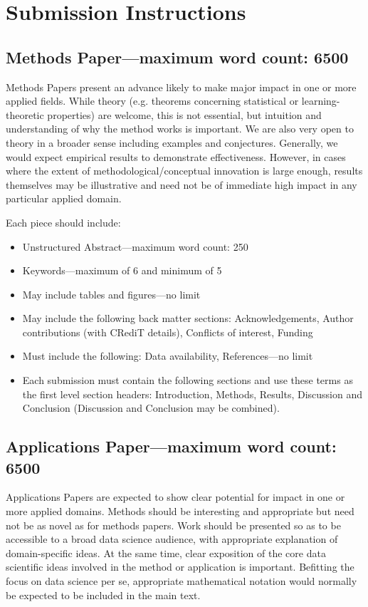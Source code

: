 \section{Submission Instructions}

\subsection{Methods Paper—maximum word count: 6500}

Methods Papers present an advance likely to make major impact in one or more applied
fields. While theory (e.g. theorems concerning statistical or
learning-theoretic properties) are welcome, this is not essential, but intuition and
understanding of why the method works is important.
We are also very open to theory in a broader sense including examples and conjectures.
Generally, we would expect empirical results to demonstrate effectiveness.
However, in cases where the extent of methodological/conceptual innovation is large
enough, results themselves may be illustrative and need not be of immediate high impact
in any particular applied domain.

Each piece should include:

\begin{itemize}
  \item Unstructured Abstract—maximum word count: 250
  \item Keywords—maximum of 6 and minimum of 5
  \item May include tables and figures—no limit
  \item May include the following back matter sections:
  Acknowledgements, Author contributions (with CRediT details), Conflicts of interest, Funding
  \item Must include the following:
  Data availability, References—no limit
  \item Each submission must contain the following sections and use these terms as the first
  level section headers: Introduction, Methods, Results, Discussion and Conclusion
  (Discussion and Conclusion may be combined).
\end{itemize}


\subsection{Applications Paper—maximum word count: 6500}

Applications Papers are expected to show clear potential for impact in one or more applied domains. Methods should be interesting and appropriate but need not be as novel as for methods papers. Work should be presented so as to be accessible to a broad data science audience, with appropriate explanation of domain-specific ideas. At the same time, clear exposition of the core data scientific ideas involved in the method or application is important. Befitting the focus on data science per se, appropriate mathematical notation would normally be expected to be included in the main text.



